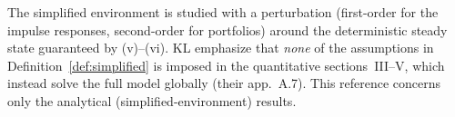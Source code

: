 \begin{remark}
The simplified environment is studied with a perturbation (first-order for the
impulse responses, second-order for portfolios) around the deterministic steady
state guaranteed by (v)--(vi). KL emphasize that \emph{none} of the assumptions
in Definition~\ref{def:simplified} is imposed in the quantitative sections~III--V,
which instead solve the full model globally (their app.\ A.7). This reference
concerns only the analytical (simplified-environment) results.
\end{remark}
